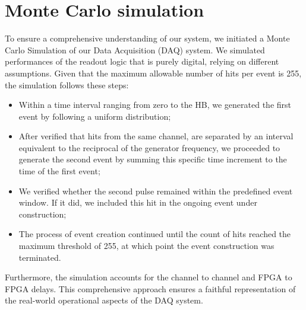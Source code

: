 \section{Monte Carlo simulation}\label{MonteCarlo}

To ensure a comprehensive understanding of our system, we initiated a Monte Carlo Simulation of our Data Acquisition (DAQ) system. 
We simulated performances of the readout logic that is purely digital, relying on different assumptions.
Given that the maximum allowable number of hits per event is 255, the simulation follows these steps:
\begin{itemize}
  \item Within a time interval ranging from zero to the HB, we generated the first event by following a uniform distribution;
    \item After verified that hits from the same channel, are separated by an interval equivalent to the reciprocal of the generator frequency, we proceeded to generate the second event by summing this specific time increment to the time of the first event;
      \item We verified whether the second pulse remained within the predefined event window. If it did, we included this hit in the ongoing event under construction;
      \item The process of event creation continued until the count of hits reached the maximum threshold of 255, at which point the event construction was terminated.
\end{itemize}
Furthermore, the simulation accounts for the channel to channel and FPGA to FPGA delays. 
This comprehensive approach ensures a faithful representation of the real-world operational aspects of the DAQ system.



